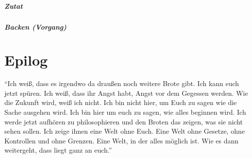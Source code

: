 \documentclass{scrbook}
\begin{document}
\paragraph{Zutat} %

\paragraph{Backen (Vorgang)} %

\chapter*{Epilog}

"`Ich weiß, dass es irgendwo da draußen noch weitere Brote gibt. Ich kann euch jetzt spüren. Ich weiß, dass ihr Angst habt, Angst vor dem Gegessen werden. Wie die Zukunft wird, weiß ich nicht. Ich bin nicht hier, um Euch zu sagen wie die Sache ausgehen wird. Ich bin hier um euch zu sagen, wie alles beginnen wird. Ich werde jetzt aufhören zu philosophieren und den Broten das zeigen, was sie nicht sehen sollen. Ich zeige ihnen eine Welt ohne Euch. Eine Welt ohne Gesetze, ohne Kontrollen und ohne Grenzen. Eine Welt, in der alles möglich ist. Wie es dann weitergeht, dass liegt ganz an euch."'

\end{document}
